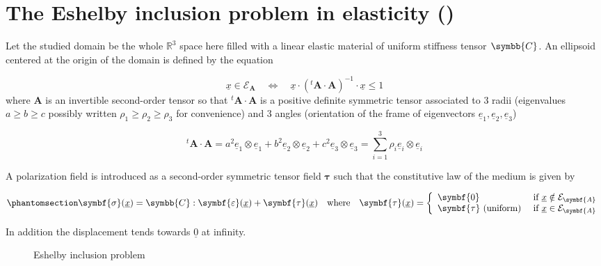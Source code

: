 \documentclass[
  a4paper,
  numbers=noendperiod,
  DIV=12]{scrreprt}
\newcommand{\R}{{\mathbb{{R}}}}
\newcommand{\uu}[1]{{\symbf{{#1}}}}
\newcommand{\uuuu}[1]{{\symbb{{#1}}}}
\newcommand{\uv}[1]{{\underline{{#1}}}}
\newcommand{\x}{{\uv{{x}}}}
\newcommand{\eps}{{\uu{{\varepsilon}}}}
\newcommand{\sig}{{\uu{{\sigma}}}}
\newcommand{\trans}[1]{{{}^{t}{#1}}}
\begin{document}
\section{\texorpdfstring{The Eshelby inclusion problem in elasticity
()}{The Eshelby inclusion problem in elasticity (Eshelby, 1957)}}\label{the-eshelby-inclusion-problem-in-elasticity-eshelby1957}

Let the studied domain be the whole \(\R^3\) space here filled with a
linear elastic material of uniform stiffness tensor \(\uuuu{C}\). An
ellipsoid centered at the origin of the domain is defined by the
equation

\[
   \uv{x}\in\mathcal{E}_{\uu{A}}
\quad\Leftrightarrow\quad   
\uv{x}\cdot(\trans{\uu{A}}\cdot\uu{A})^{-1}\cdot\uv{x}\leq 1
\] where \(\uu{A}\) is an invertible second-order tensor so that
\(\trans{\uu{A}}\cdot\uu{A}\) is a positive definite symmetric tensor
associated to 3 radii (eigenvalues \(a\geq b \geq c\) possibly written
\(\rho_1 \geq \rho_2 \geq \rho_3\) for convenience) and 3 angles
(orientation of the frame of eigenvectors
\(\uv{e}_1, \uv{e}_2, \uv{e}_3\))

\[
\trans{\uu{A}}\cdot\uu{A}=a^2 \uv{e}_1\otimes\uv{e}_1 + b^2 \uv{e}_2\otimes\uv{e}_2 + c^2 \uv{e}_3\otimes\uv{e}_3 = \sum_{i=1}^3 \rho_i \uv{e}_i\otimes\uv{e}_i
\]

A polarization field is introduced as a second-order symmetric tensor
field \(\uu{\tau}\) such that the constitutive law of the medium is
given by

\begin{equation}\phantomsection\label{eq-law}{
    \sig(\x)=\uuuu{C}:\eps(\x)+\uu{\tau}(\x)\quad\textrm{where}\quad
    \uu{\tau}(\x)=
    \left\{
    \begin{array}{ll}
    \uu{0}&\textrm{ if }\x \notin \mathcal{E}_{\uu{A}}\\
    \uu{\tau}\textrm{ (uniform)}&\textrm{ if }\x \in \mathcal{E}_{\uu{A}}
    \end{array}
    \right.
}\end{equation}

In addition the displacement tends towards \(\uv{0}\) at infinity.

\begin{figure}


\caption{\label{fig-eurlerangles}Eshelby inclusion problem}

\end{figure}%
\end{document}
